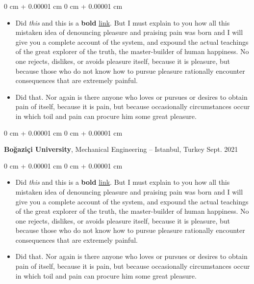 \documentclass[10pt, letterpaper]{article}
\newenvironment{highlights}{
    \begin{itemize}[
        topsep=0.10 cm,
        parsep=0.10 cm,
        partopsep=0pt,
        itemsep=0pt,
        leftmargin=0 cm + 10pt
    ]
}{
    \end{itemize}
} %
\newenvironment{onecolentry}{
    \begin{adjustwidth}{
        0 cm + 0.00001 cm
    }{
        0 cm + 0.00001 cm
    }
}{
    \end{adjustwidth}
} %
\newenvironment{twocolentry}[2][]{
    \onecolentry
    \def\secondColumn{#2}
    \setcolumnwidth{\fill, 4.5 cm}
    \begin{paracol}{2}
}{
    \switchcolumn \raggedleft \secondColumn
    \end{paracol}
    \endonecolentry
} %
\begin{document}
        \vspace{0.10 cm}
        \begin{onecolentry}
            \begin{highlights}
                \item Did \textit{this} and this is a \textbf{bold} \href{https://example.com}{link}. But I must explain to you how all this mistaken idea of denouncing pleasure and praising pain was born and I will give you a complete account of the system, and expound the actual teachings of the great explorer of the truth, the master-builder of human happiness. No one rejects, dislikes, or avoids pleasure itself, because it is pleasure, but because those who do not know how to pursue pleasure rationally encounter consequences that are extremely painful.
                \item Did that. Nor again is there anyone who loves or pursues or desires to obtain pain of itself, because it is pain, but because occasionally circumstances occur in which toil and pain can procure him some great pleasure.
            \end{highlights}
        \end{onecolentry}


        \vspace{0.2 cm}

        \begin{twocolentry}{
            Sept. 2021
        }
            \textbf{Boğaziçi University}, Mechanical Engineering -- Istanbul, Turkey\end{twocolentry}

        \vspace{0.10 cm}
        \begin{onecolentry}
            \begin{highlights}
                \item Did \textit{this} and this is a \textbf{bold} \href{https://example.com}{link}. But I must explain to you how all this mistaken idea of denouncing pleasure and praising pain was born and I will give you a complete account of the system, and expound the actual teachings of the great explorer of the truth, the master-builder of human happiness. No one rejects, dislikes, or avoids pleasure itself, because it is pleasure, but because those who do not know how to pursue pleasure rationally encounter consequences that are extremely painful.
                \item Did that. Nor again is there anyone who loves or pursues or desires to obtain pain of itself, because it is pain, but because occasionally circumstances occur in which toil and pain can procure him some great pleasure.
            \end{highlights}
        \end{onecolentry}
\end{document}
